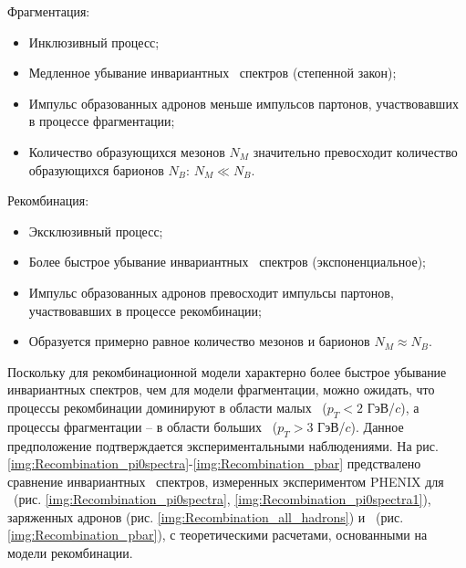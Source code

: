 Фрагментация:
\begin{itemize}[]
	\item Инклюзивный процесс;
	\item Медленное убывание инвариантных \pt \ спектров (степенной закон);
	\item Импульс образованных адронов меньше импульсов партонов, участвовавших в процессе фрагментации;
	\item Количество образующихся мезонов $N_M$ значительно превосходит количество образующихся барионов $N_B$: $N_M \ll N_B$.
\end{itemize}

Рекомбинация:
\begin{itemize}[]
	\item Эксклюзивный процесс;
	\item Более быстрое убывание инвариантных \pt \ спектров (экспоненциальное);
	\item Импульс образованных адронов превосходит импульсы партонов, участвовавших в процессе рекомбинации;
	\item Образуется примерно равное количество мезонов и барионов $N_M \approx N_B$.
	
\end{itemize}

\begin{comment}
	Процесс фрагментации является инклюзивным, поскольку любой жесткий партон ($p_T > 5$) может фрагментировать с образованием новых адронов, тогда как для рекомбинации необходимо, чтобы они находились в на расстоянии в фазовом пространстве меньшем, чем радиус рекомбинации. 
	Инвариантный \pt \ спектр адронов, предсказываемый моделью фрагментации, имеет более медленный спад по сравнению с тем, что предсказывает модель рекомбинаци. Фрагментация значительно благоприятствует образованию мезонов, поскольку при фрагментации с гораздо большей вероятностью образуется кварк-антикварковая пара, чем дикварк [4]. 4]; при рекомбинации они образуются примерно в равной степени.
\end{comment}
Поскольку для рекомбинационной модели характерно более быстрое убывание инвариантных \pt  спектров, чем  для модели фрагментации, можно ожидать, что процессы рекомбинации доминируют в области малых \pt \ ($p_T<2$ ГэВ/$c$), а процессы фрагментации -- в области больших \pt \ ($p_T>3$ ГэВ/$c$). Данное предположение подтверждается экспериментальными наблюдениями. На рис. \ref{img:Recombination_pi0spectra}-\ref{img:Recombination_pbar} предствалено сравнение инвариантных \pt \ спектров, измеренных экспериментом PHENIX для \pio \ (рис. \ref{img:Recombination_pi0spectra}, \ref{img:Recombination_pi0spectra1}), заряженных адронов (рис. \ref{img:Recombination_all_hadrons}) и \aprot \ (рис. \ref{img:Recombination_pbar}), с теоретическими расчетами, основанными на модели рекомбинации. 


